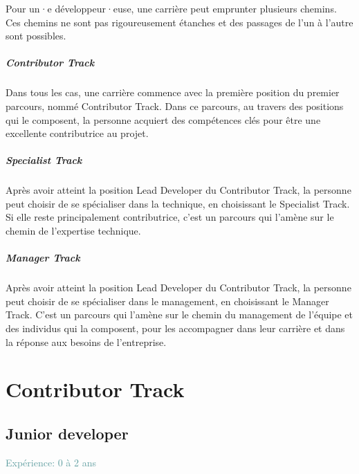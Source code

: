 \documentclass[a4paper, french, openany, 12pt]{book}
\newcommand\xp[1]{\textcolor{CadetBlue}{Expérience: {#1} ans}}
\newcommand\dev{développeur·euse}
\begin{document}
\begin{multicols}{2}
  Pour un·e \dev, une carrière peut emprunter plusieurs chemins.
  Ces chemins ne sont pas rigoureusement étanches et des passages de l'un à l'autre sont possibles.

  \subsubsection*{Contributor Track}

  Dans tous les cas, une carrière commence avec la première position du premier parcours, nommé Contributor Track.
  Dans ce parcours, au travers des positions qui le composent, la personne acquiert des compétences clés pour être une
  excellente contributrice au projet.

  \subsubsection*{Specialist Track}

  Après avoir atteint la position Lead Developer du Contributor Track, la personne peut choisir de se spécialiser 
  dans la technique, en choisissant le Specialist Track.
  Si elle reste principalement contributrice, c'est un parcours qui l'amène sur le chemin de l'expertise technique.

  \subsubsection*{Manager Track}

  Après avoir atteint la position Lead Developer du Contributor Track, la personne peut choisir de se spécialiser 
  dans le management, en choisissant le Manager Track.
  C'est un parcours qui l'amène sur le chemin du management de l'équipe et des individus qui la composent, pour les
  accompagner dans leur carrière et dans la réponse aux besoins de l'entreprise.

\end{multicols}

\part{Contributor Track}

\chapter{Junior developer}

\xp{0 à 2}
\end{document}
